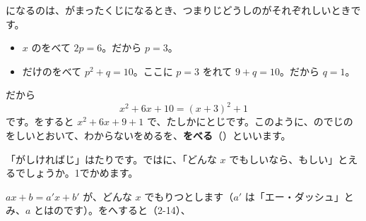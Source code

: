 になるのは、がまったくじになるとき、つまりじどうしのがそれぞれしいときです。
\begin{itemize}[label={\color{bkOrange}●}, leftmargin=1.6\zw, itemsep=2pt, topsep=3pt]
\item $x$ のをべて $2p=6$。だから $p=3$。
\item {}だけのをべて $p^2+q=10$。ここに $p=3$ をれて $9+q=10$。だから $q=1$。
\end{itemize}
だから
\[ x^2+6x+10=(x+3)^2+1 \]
です。をすると $x^2+6x+9+1$ で、たしかにとじです。このように、のでじのをしいとおいて、わからないをめるを、\textbf{をべる}（）といいます。

「がしければじ」はたりです。ではに、「どんな $x$ でもしいなら、もしい」とえるでしょうか。1でかめます。

$ax+b=a'x+b'$ が、どんな $x$ でもりつとします（$a'$ は「エー・ダッシュ」とみ、$a$ とはのです）。をへすると（2-14）、

